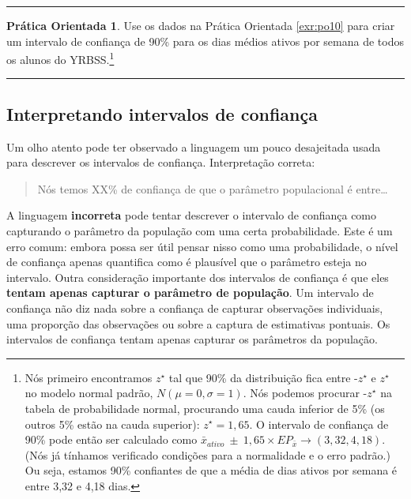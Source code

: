 \documentclass[
]{book}
\theoremstyle{definition}
\theoremstyle{definition}
\theoremstyle{definition}
\newtheorem{exercise}{Prática Orientada}[chapter]
\theoremstyle{definition}
\theoremstyle{remark}
\begin{document}
\begin{center}\rule{0.5\linewidth}{0.5pt}\end{center}

\begin{exercise}
\protect\hypertarget{exr:unnamed-chunk-158}{}{\label{exr:unnamed-chunk-158} }Use os dados na Prática Orientada \ref{exr:po10} para criar um intervalo de confiança de 90\% para os dias médios ativos por semana de todos os alunos do YRBSS.\footnote{Nós primeiro encontramos \(z^{\star}\) tal que 90\% da distribuição fica entre -\(z^{\star}\) e \(z^{\star}\) no modelo normal padrão, \(N(\mu=0, \sigma=1)\). Nós podemos procurar -\(z^{\star}\) na tabela de probabilidade normal, procurando uma cauda inferior de 5\% (os outros 5\% estão na cauda superior): \(z^{\star}=1,65\). O intervalo de confiança de 90\% pode então ser calculado como \(\bar{x}_{ativo}\ \pm\ 1,65\times EP_{\bar{x}} \to (3,32, 4,18)\). (Nós já tínhamos verificado condições para a normalidade e o erro padrão.) Ou seja, estamos 90\% confiantes de que a média de dias ativos por semana é entre 3,32 e 4,18 dias.}
\end{exercise}

\begin{center}\rule{0.5\linewidth}{0.5pt}\end{center}

\hypertarget{interpretingConfidenceIntervals}{%
\subsection{Interpretando intervalos de confiança}\label{interpretingConfidenceIntervals}}

Um olho atento pode ter observado a linguagem um pouco desajeitada usada para descrever os intervalos de confiança. Interpretação correta:

\begin{quote}
Nós temos XX\% de confiança de que o parâmetro populacional é entre\ldots{}
\end{quote}

A linguagem \textbf{incorreta} pode tentar descrever o intervalo de confiança como capturando o parâmetro da população com uma certa probabilidade. Este é um erro comum: embora possa ser útil pensar nisso como uma probabilidade, o nível de confiança apenas quantifica como é plausível que o parâmetro esteja no intervalo.
Outra consideração importante dos intervalos de confiança é que eles \textbf{tentam apenas capturar o parâmetro de população}. Um intervalo de confiança não diz nada sobre a confiança de capturar observações individuais, uma proporção das observações ou sobre a captura de estimativas pontuais. Os intervalos de confiança tentam apenas capturar os parâmetros da população.
\end{document}
